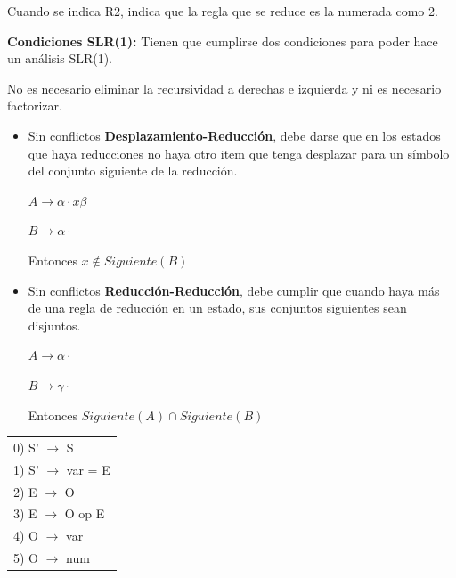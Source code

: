 \documentclass[12pt, twoside, openright]{report} %
\begin{document}
Cuando se indica R2, indica que la regla que se reduce es la numerada como 2.

\textbf{Condiciones SLR(1):}
Tienen que cumplirse dos condiciones para poder hace un análisis SLR(1). 

No es necesario eliminar la recursividad a derechas e izquierda y ni es necesario factorizar.

\begin{itemize}
  \item Sin conflictos \textbf{Desplazamiento-Reducción}, debe darse que en los estados que haya reducciones no haya otro item que tenga desplazar para un símbolo del conjunto siguiente de la reducción.
  
  $A \rightarrow \alpha \cdot x \beta$

  $B \rightarrow \alpha \cdot$

  Entonces $x \notin Siguiente(B)$

  \item Sin conflictos \textbf{Reducción-Reducción}, debe cumplir que cuando haya más de una regla de reducción en un estado, sus conjuntos siguientes sean disjuntos.
    
  $A \rightarrow \alpha \cdot $

  $B \rightarrow \gamma \cdot$

  Entonces $Siguiente(A) \cap Siguiente(B)$
\end{itemize}

\begin{table}[H]
\centering
\begin{tabular}{l}
0) S' $\rightarrow$ S       \\
1) S' $\rightarrow$ var = E \\
2) E $\rightarrow$ O        \\
3) E $\rightarrow$ O op E   \\
4) O $\rightarrow$ var      \\
5) O $\rightarrow$ num
\end{tabular}
\end{table}
\end{document}
